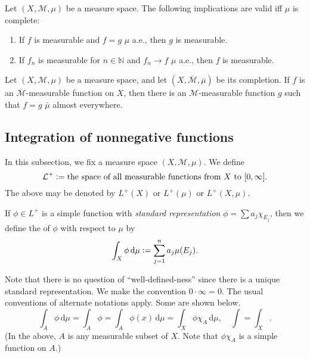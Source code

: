 \documentclass[12pt]{article}	%
\begin{document}
\begin{prop}
	Let $(X, \mathcal{M}, \mu)$ be a measure space. The following implications are valid iff $\mu$ is complete:
	\begin{enumerate}
		\item If $f$ is measurable and $f = g$ $\mu$ a.e., then $g$ is measurable.
		\item If $f_{n}$ is measurable for $n \in \mathbb{N}$ and $f_{n} \to f$ $\mu$ a.e., then $f$ is measurable.
	\end{enumerate}
\end{prop}

\begin{prop}
	Let $(X, \mathcal{M}, \mu)$ be a measure space, and let $(X, \overline{\mathcal{M}}, \overline{\mu})$ be its completion. If $f$ is an $\overline{\mathcal{M}}$-measurable function on $X$, then there is an $\mathcal{M}$-measurable function $g$ such that $f = g$ $\bar{\mu}$ almost everywhere.
\end{prop}

\subsection{Integration of nonnegative functions}

In this subsection, we fix a measure space $(X, \mathcal{M}, \mu)$. We define
\begin{equation*} 
	\mathcal{L}^{+} \vcentcolon= \text{the space of all measurable functions from $X$ to $[0, \infty]$.}
\end{equation*}
The above may be denoted by $L^{+}(X)$ or $L^{+}(\mu)$ or $L^{+}(X, \mu)$.

If $\phi \in L^{+}$ is a simple function with \emph{standard representation} $\phi = \sum a_{j} \chi_{E_{j}}$, then we define the  of $\phi$ with respect to $\mu$ by
\begin{equation*} 
	\int_{X} \phi \,{\mathrm{d}}\mu \vcentcolon= \sum_{j = 1}^{n} a_{j} \mu(E_{j}).
\end{equation*}

Note that there is no question of ``well-defined-ness'' since there is a unique standard representation. We make the convention $0 \cdot \infty = 0$. The usual conventions of alternate notations apply. Some are shown below.
\begin{equation*} 
	\int_{A} \phi \,{\mathrm{d}}\mu = \int_{A} \phi = \int_{A} \phi(x) \,{\mathrm d}\mu = \int_{X} \phi \chi_{A} \,{\mathrm d}\mu, \quad \int = \int_{X}.
\end{equation*}
(In the above, $A$ is any measurable subset of $X$. Note that $\phi \chi_{A}$ is a simple function on $A$.)
\end{document}
